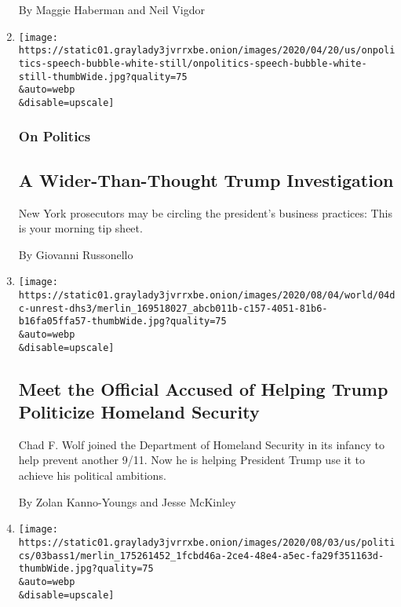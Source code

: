 \begin{enumerate}
  By Maggie Haberman and Neil Vigdor
\item
  \href{/2020/08/04/us/politics/trump-prosecutors.html}{}

  \texttt{[image: https://static01.graylady3jvrrxbe.onion/images/2020/04/20/us/onpolitics-speech-bubble-white-still/onpolitics-speech-bubble-white-still-thumbWide.jpg?quality=75\\\&auto=webp\\\&disable=upscale]}

  \hypertarget{on-politics}{%
  \subsubsection{On Politics}\label{on-politics}}

  \hypertarget{a-wider-than-thought-trump-investigation}{%
  \subsection{A Wider-Than-Thought Trump
  Investigation}\label{a-wider-than-thought-trump-investigation}}

  New York prosecutors may be circling the president's business
  practices: This is your morning tip sheet.

  By Giovanni Russonello
\item
  \href{/2020/08/04/us/politics/trump-homeland-security.html}{}

  \texttt{[image: https://static01.graylady3jvrrxbe.onion/images/2020/08/04/world/04dc-unrest-dhs3/merlin\_169518027\_abcb011b-c157-4051-81b6-b16fa05ffa57-thumbWide.jpg?quality=75\\\&auto=webp\\\&disable=upscale]}

  \hypertarget{meet-the-official-accused-of-helping-trump-politicize-homeland-security-1}{%
  \subsection{Meet the Official Accused of Helping Trump Politicize
  Homeland
  Security}\label{meet-the-official-accused-of-helping-trump-politicize-homeland-security-1}}

  Chad F. Wolf joined the Department of Homeland Security in its infancy
  to help prevent another 9/11. Now he is helping President Trump use it
  to achieve his political ambitions.

  By Zolan Kanno-Youngs and Jesse McKinley
\item
  \href{/2020/08/04/us/politics/karen-bass-vice-president-biden.html}{}

  \texttt{[image: https://static01.graylady3jvrrxbe.onion/images/2020/08/03/us/politics/03bass1/merlin\_175261452\_1fcbd46a-2ce4-48e4-a5ec-fa29f351163d-thumbWide.jpg?quality=75\\\&auto=webp\\\&disable=upscale]}


\end{enumerate}
